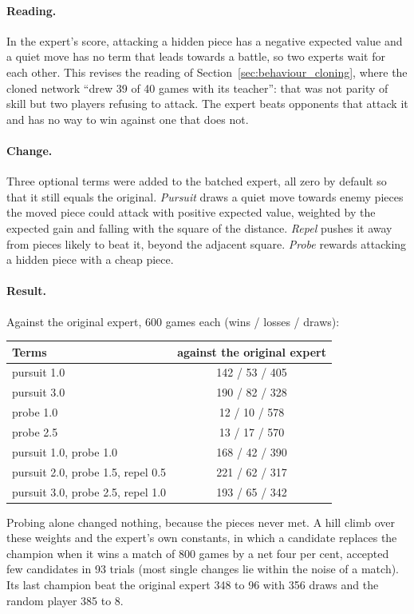 \paragraph{Reading.} In the expert's score, attacking a hidden piece has a negative expected
value and a quiet move has no term that leads towards a battle, so two experts wait for each other.
This revises the reading of Section~\ref{sec:behaviour_cloning}, where the cloned network ``drew
39 of 40 games with its teacher'': that was not parity of skill but two players refusing to
attack. The expert beats opponents that attack it and has no way to win against one that does not.

\paragraph{Change.} Three optional terms were added to the batched expert, all zero by default so
that it still equals the original. \emph{Pursuit} draws a quiet move towards enemy pieces the moved
piece could attack with positive expected value, weighted by the expected gain and falling with
the square of the distance. \emph{Repel} pushes it away from pieces likely to beat it, beyond the
adjacent square. \emph{Probe} rewards attacking a hidden piece with a cheap piece.

\paragraph{Result.} Against the original expert, 600 games each (wins / losses / draws):
\begin{center}
\small
\begin{tabular}{lc}
\toprule
Terms & against the original expert \\
\midrule
pursuit 1.0 & 142 / 53 / 405 \\
pursuit 3.0 & 190 / 82 / 328 \\
probe 1.0 & 12 / 10 / 578 \\
probe 2.5 & 13 / 17 / 570 \\
pursuit 1.0, probe 1.0 & 168 / 42 / 390 \\
pursuit 2.0, probe 1.5, repel 0.5 & 221 / 62 / 317 \\
pursuit 3.0, probe 2.5, repel 1.0 & 193 / 65 / 342 \\
\bottomrule
\end{tabular}
\end{center}
Probing alone changed nothing, because the pieces never met. A hill climb over these weights and
the expert's own constants, in which a candidate replaces the champion when it wins a match of 800
games by a net four per cent, accepted few candidates in 93 trials (most single changes lie within
the noise of a match). Its last champion beat the original expert 348 to 96 with 356 draws and the
random player 385 to 8.

